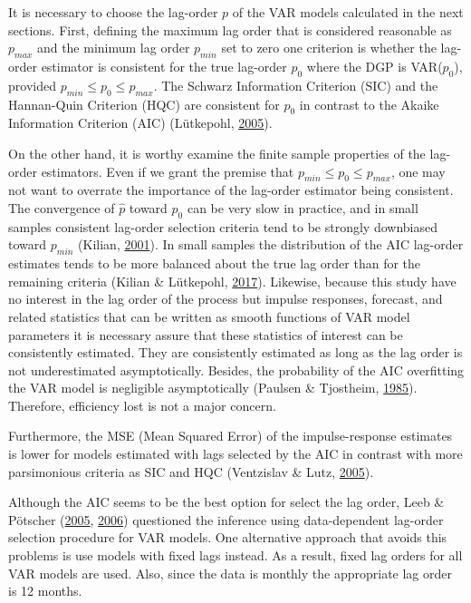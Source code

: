 \documentclass[12pt,twoside]{reedthesis}
\begin{document}
It is necessary to choose the lag-order \(p\) of the VAR models calculated in the next sections. First, defining the maximum lag order that is considered reasonable as \(p_{max}\) and the minimum lag order \(p_{min}\) set to zero one criterion is whether the lag-order estimator is consistent for the true lag-order \(p_{0}\) where the DGP is VAR(\(p_{0}\)), provided \(p_{min} \leq p_{0} \leq p_{max}\). The Schwarz Information Criterion (SIC) and the Hannan-Quin Criterion (HQC) are consistent for \(p_{0}\) in contrast to the Akaike Information Criterion (AIC) (Lütkepohl, \protect\hyperlink{ref-lutkepohl:2005}{2005}).

On the other hand, it is worthy examine the finite sample properties of the lag-order estimators. Even if we grant the premise that \(p_{min} \leq p_{0} \leq p_{max}\), one may not want to overrate the importance of the lag-order estimator being consistent. The convergence of \(\hat{p}\) toward \(p_{0}\) can be very slow in practice, and in small samples consistent lag-order selection criteria tend to be strongly downbiased toward \(p_{min}\) (Kilian, \protect\hyperlink{ref-kilian:2001}{2001}). In small samples the distribution of the AIC lag-order estimates tends to be more balanced about the true lag order than for the remaining criteria (Kilian \& Lütkepohl, \protect\hyperlink{ref-kililutk:2017}{2017}). Likewise, because this study have no interest in the lag order of the process but impulse responses, forecast, and related statistics that can be written as smooth functions of VAR model parameters it is necessary assure that these statistics of interest can be consistently estimated. They are consistently estimated as long as the lag order is not underestimated asymptotically. Besides, the probability of the AIC overfitting the VAR model is negligible asymptotically (Paulsen \& Tjostheim, \protect\hyperlink{ref-paultjos:1985}{1985}). Therefore, efficiency lost is not a major concern.

Furthermore, the MSE (Mean Squared Error) of the impulse-response estimates is lower for models estimated with lags selected by the AIC in contrast with more parsimonious criteria as SIC and HQC (Ventzislav \& Lutz, \protect\hyperlink{ref-ventlutz:2005}{2005}).

Although the AIC seems to be the best option for select the lag order, Leeb \& Pötscher (\protect\hyperlink{ref-leebpots:2005}{2005}, \protect\hyperlink{ref-leebpots:2006}{2006}) questioned the inference using data-dependent lag-order selection procedure for VAR models. One alternative approach that avoids this problems is use models with fixed lags instead. As a result, fixed lag orders for all VAR models are used. Also, since the data is monthly the appropriate lag order is 12 months.
\end{document}
